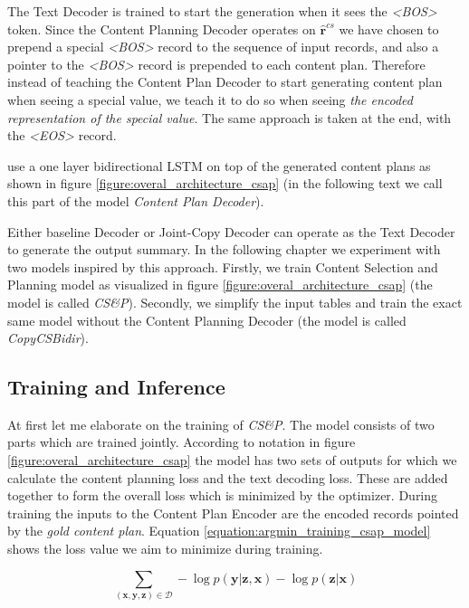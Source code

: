 The Text Decoder is trained to start the generation when it sees the \emph{\textless BOS\textgreater} token. Since the Content Planning Decoder operates on $\hat{\boldsymbol{r}}^{cs}$ we have chosen to prepend a special \emph{\textless BOS\textgreater} record to the sequence of input records, and also a pointer to the \emph{\textless BOS\textgreater} record is prepended to each content plan. Therefore instead of teaching the Content Plan Decoder to start generating content plan when seeing a special value, we teach it to do so when seeing \emph{the encoded representation of the special value}. The same approach is taken at the end, with the \emph{\textless EOS\textgreater} record.

\citet{puduppully2019datatotext} use a one layer bidirectional LSTM on top of the generated content plans as shown in figure \ref{figure:overal_architecture_csap} (in the following text we call this part of the model \emph{Content Plan Decoder}).

Either baseline Decoder or Joint-Copy Decoder can operate as the Text Decoder to generate the output summary. In the following chapter we experiment with two models inspired by this approach. Firstly, we train Content Selection and Planning model as visualized in figure \ref{figure:overal_architecture_csap} (the model is called \emph{CS\&P}). Secondly, we simplify the input tables and train the exact same model without the Content Planning Decoder (the model is called \emph{CopyCSBidir}).

\subsection{Training and Inference}

At first let me elaborate on the training of \emph{CS\&P}. The model consists of two parts which are trained jointly. According to notation in figure \ref{figure:overal_architecture_csap} the model has two sets of outputs for which we calculate the content planning loss and the text decoding loss. These are added together to form the overall loss which is minimized by the optimizer. During training the inputs to the Content Plan Encoder are the encoded records pointed by the \emph{gold content plan}. Equation \ref{equation:argmin_training_csap_model} shows the loss value we aim to minimize during training.

\begin{equation} \label{equation:argmin_training_csap_model}
    \sum_{(\boldsymbol{x}, \boldsymbol{y}, \boldsymbol{z}) \in \mathcal{D}} - \log{p(\boldsymbol{y}|\boldsymbol{z}, \boldsymbol{x})} - \log{p(\boldsymbol{z} | \boldsymbol{x})}
\end{equation}

